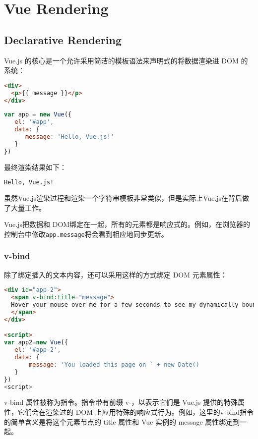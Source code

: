 \chapter{Vue Rendering}



\section{Declarative Rendering}



Vue.js 的核心是一个允许采用简洁的模板语法来声明式的将数据渲染进 DOM 的系统：


\begin{lstlisting}[language=HTML]
<div>
  <p>{{ message }}</p>
</div>
\end{lstlisting}



\begin{lstlisting}[language=JavaScript]
var app = new Vue({
   el: '#app',
   data: {
      message: 'Hello, Vue.js!'
   }
})
\end{lstlisting}


最终渲染结果如下：

\begin{lstlisting}[language=HTML]
Hello, Vue.js!
\end{lstlisting}


虽然Vue.js渲染过程和渲染一个字符串模板非常类似，但是实际上Vue.js在背后做了大量工作。

Vue.js把数据和 DOM绑定在一起，所有的元素都是响应式的。例如，在浏览器的控制台中修改\texttt{app.message}将会看到相应地同步更新。

\subsection{v-bind}


除了绑定插入的文本内容，还可以采用这样的方式绑定 DOM 元素属性：


\begin{lstlisting}[language=HTML]
<div id="app-2">
  <span v-bind:title="message">
  Hover your mouse over me for a few seconds to see my dynamically bound title!
  </span>
</div>

<script>
var app2=new Vue({
   el: '#app-2',
   data: {
       message: 'You loaded this page on ` + new Date()
   }
})
<script>
\end{lstlisting}

v-bind 属性被称为指令。指令带有前缀 v-，以表示它们是 Vue.js 提供的特殊属性，它们会在渲染过的 DOM 上应用特殊的响应式行为。例如，这里的v-bind指令的简单含义是将这个元素节点的 title 属性和 Vue 实例的 message 属性绑定到一起。

